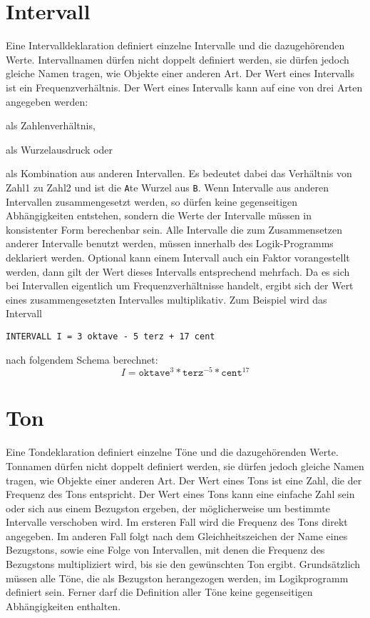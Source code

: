 

\chapter{Intervall}\label{cha:intervall}

Eine Intervalldeklaration definiert einzelne Intervalle und die
dazugehörenden Werte. Intervallnamen dürfen nicht doppelt definiert
werden, sie dürfen jedoch gleiche Namen tragen,
wie Objekte einer anderen Art.
Der Wert eines Intervalls ist ein Frequenzverhältnis.
Der Wert eines Intervalls kann auf eine von drei Arten angegeben werden:
\bi
  \item als Zahlenverhältnis,
  \item als Wurzelausdruck oder
  \item als Kombination aus anderen Intervallen.
\ei
Es bedeutet dabei
 das Verhältnis von Zahl1 zu Zahl2 und
 ist die \texttt{A}te Wurzel aus \texttt{B}.
Wenn Intervalle aus anderen Intervallen zusammengesetzt werden,
so dürfen keine gegenseitigen Abhängigkeiten entstehen, sondern
die Werte der Intervalle müssen in konsistenter Form berechenbar sein.
Alle Intervalle die zum Zusammensetzen anderer Intervalle benutzt werden,
müssen innerhalb des Logik-Programms deklariert werden.
Optional kann einem Intervall auch ein Faktor
 vorangestellt werden, dann gilt der Wert dieses Intervalls
entsprechend mehrfach. Da es sich bei Intervallen eigentlich um
Frequenzverhältnisse handelt, ergibt sich der Wert eines zusammengesetzten
Intervalles multiplikativ. Zum Beispiel wird das Intervall
\begin{verbatim} 
INTERVALL I = 3 oktave - 5 terz + 17 cent 
\end{verbatim}
 nach folgendem Schema
berechnet: \[I = \mathtt{oktave}^{3} * \mathtt{terz}^{-5} * \mathtt{cent}^{17}\]





\chapter{Ton}\label{cha:ton}

Eine Tondeklaration definiert einzelne Töne und die
dazugehörenden Werte. Tonnamen dürfen nicht doppelt definiert
werden, sie dürfen jedoch gleiche Namen tragen,
wie Objekte einer anderen Art.
Der Wert eines Tons ist eine Zahl, die der Frequenz des Tons
entspricht. Der Wert eines Tons kann eine einfache Zahl sein oder
sich aus einem Bezugston
 ergeben, der möglicherweise
um bestimmte Intervalle verschoben wird.
Im ersteren Fall wird die Frequenz
 des Tons direkt angegeben.
Im anderen Fall folgt nach dem Gleichheitszeichen der Name eines
Bezugstons, sowie eine Folge von Intervallen, mit denen die Frequenz des
Bezugstons multipliziert wird, bis sie den gewünschten Ton ergibt.
Grundsätzlich müssen alle Töne, die als Bezugston herangezogen werden,
im Logikprogramm definiert sein. Ferner darf die Definition aller Töne
keine gegenseitigen Abhängigkeiten enthalten.

